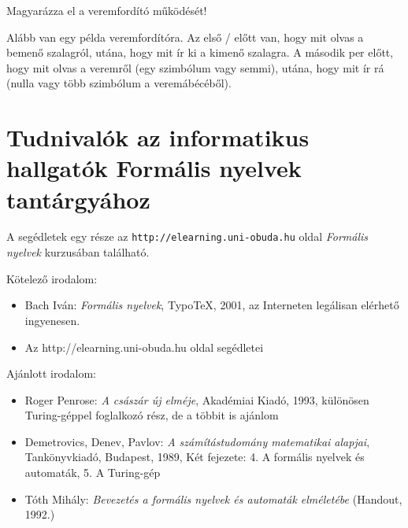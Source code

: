 \documentclass[a4paper]{article}
\begin{document}
Magyarázza el a veremfordító  működését!

Alább van egy példa veremfordítóra. Az első / előtt van, hogy mit olvas
a bemenő szalagról, utána, hogy mit ír ki a kimenő szalagra. A második
per előtt, hogy mit olvas a veremről (egy szimbólum vagy semmi), utána,
hogy mit ír rá (nulla vagy több szimbólum a veremábécéből).



\newpage
\section{Tudnivalók az informatikus hallgatók Formális nyelvek
tantárgyához}
A segédletek egy része az \verb|http://elearning.uni-obuda.hu| oldal
\emph{Formális nyelvek} kurzusában található.

\vspace{2ex}

Kötelező irodalom:
\begin{itemize}
\item Bach Iván: \emph{Formális nyelvek}, Typo\TeX, 2001, az Interneten
legálisan elérhető ingyenesen.
\item Az http://elearning.uni-obuda.hu oldal segédletei
\end{itemize}

Ajánlott irodalom:
\begin{itemize}
\item Roger Penrose: \emph{A császár új elméje}, Akadémiai Kiadó, 1993,
különösen Turing-géppel foglalkozó rész, de a többit is ajánlom
\item Demetrovics, Denev, Pavlov: \emph{A számítástudomány matematikai
alapjai}, Tankönyvkiadó, Budapest, 1989,
Két fejezete: 4. A formális nyelvek és automaták, 5. A Turing-gép
\item Tóth Mihály: \emph{Bevezetés a formális nyelvek és automaták
elméletébe} (Handout, 1992.)
\end{itemize}
\end{document}
